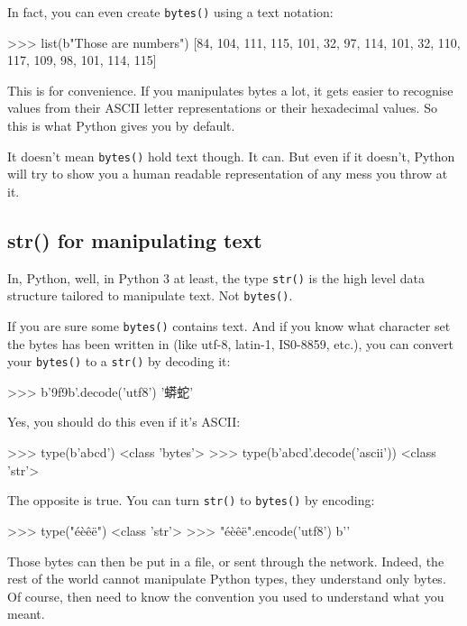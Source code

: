 In fact, you can even create \lstinline{bytes()} using a text notation:

\begin{py2and3}
>>> list(b"Those are numbers")
[84, 104, 111, 115, 101, 32, 97, 114, 101, 32, 110, 117, 109, 98, 101, 114, 115]
\end{py2and3}

This is for convenience. If you manipulates bytes a lot, it gets easier to recognise values from their ASCII letter representations or their hexadecimal values. So this is what Python gives you by default.

It doesn't mean \lstinline{bytes()} hold text though. It can. But even if it doesn't, Python will try to show you a human readable representation of any mess you throw at it.

\subsection{str() for manipulating text}

In, Python, well, in Python 3 at least, the type \lstinline{str()} is the high level data structure tailored to manipulate text. Not \lstinline{bytes()}.

If you are sure some \lstinline{bytes()} contains text. And if you know what character set the bytes has been written in (like utf-8, latin-1, IS0-8859, etc.), you can convert your \lstinline{bytes()} to a \lstinline{str()} by decoding it:

\begin{py3}
>>> b'\x9f\x9b'.decode('utf8')
'蟒蛇'
\end{py3}

Yes, you should do this even if it's ASCII:

\begin{py3}
>>> type(b'abcd')
<class 'bytes'>
>>> type(b'abcd'.decode('ascii'))
<class 'str'>
\end{py3}

The opposite is true. You can turn \lstinline{str()} to \lstinline{bytes()} by encoding:

\begin{py3}
>>> type("éèêë")
<class 'str'>
>>> "éèêë".encode('utf8')
b'\xaa{}\xab'
\end{py3}

Those bytes can then be put in a file, or sent through the network. Indeed, the rest of the world cannot manipulate Python types, they understand only bytes. Of course, then need to know the convention you used to understand what you meant.

